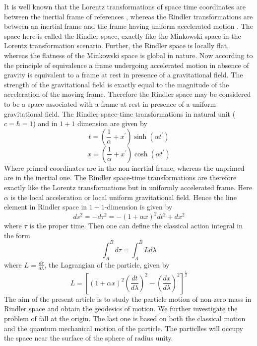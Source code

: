 \documentclass[12pt]{article}
\begin{document}
\bigskip
It is well known that 
the Lorentz transformations of space time coordinates are
between the inertial frame of
references \cite{R1}, whereas the Rindler transformations are between an inertial 
frame and 
the frame having uniform accelerated motion \cite{R2,R3,R4,R5,R6,R7,R8,R8a,R9}. The space here is called 
the Rindler space, exactly like the Minkowski space in the Lorentz 
transformation scenario. Further, the Rindler space is locally flat,
whereas the flatness of the
Minkowski space is global in nature. 
Now according to the  principle of equivalence a frame undergoing 
accelerated motion in absence of gravity is equivalent to a frame at rest 
in presence of a gravitational field. The strength of the gravitational 
field is exactly 
equal to the magnitude of the acceleration of the moving frame. Therefore the Rindler  space 
may be considered to be a space associated with a frame at rest in presence 
of a 
uniform gravitational field. The Rindler space-time  transformations
in natural unit ($c=\hbar =1$) and in $1+1$  dimension are given by \cite{R7,R8,R8a,R9}
\begin{equation}
t=\left(\frac{1}{\alpha}+x^{'}\right) \sinh(\alpha t^{'})
\end{equation}
\begin{equation}
x=\left(\frac{1}{\alpha}+x^{'}\right) \cosh(\alpha t^{'})
\end{equation}
Where primed coordinates are in the 
non-inertial frame, whereas  the unprimed  are 
in  the inertial one. The Rindler space-time  transformations are therefore 
exactly like the Lorentz  transformations but in uniformly accelerated frame. Here 
$\alpha$ is the local acceleration or local uniform gravitational field.
Hence the line element in Rindler space in $1+1$-dimension is given by
\begin{equation}     
ds^2=-d\tau^2=-(1+\alpha x)^2dt^2+dx^2
\end{equation}
where $\tau$ is the proper time. Then one can  define the classical action integral in the form \cite{R1}
\begin{equation} 
\int_A^B d\tau=\int_A^B L d\lambda
\end{equation}
 where $L=\frac{d\tau}{d\lambda}$,
 the Lagrangian of the particle, given by \cite{R10,R11,R12}
  \begin{equation}
 L=\left [(1+\alpha x)^2\left (\frac{dt}{d\lambda}\right )^2-\left
 (\frac{dx}{d\lambda}\right)^2\right ]^\frac{1}{2}
  \end{equation}
The aim of the present article is to study the particle motion of non-zero mass in Rindler
space and obtain the geodesics of motion. We further investigate the problem of fall at the
origin. The last one is based on both the classical motion and the quantum mechanical motion of the
particle. The particlles will occupy the space near the surface of the sphere of radius unity.
\end{document}
